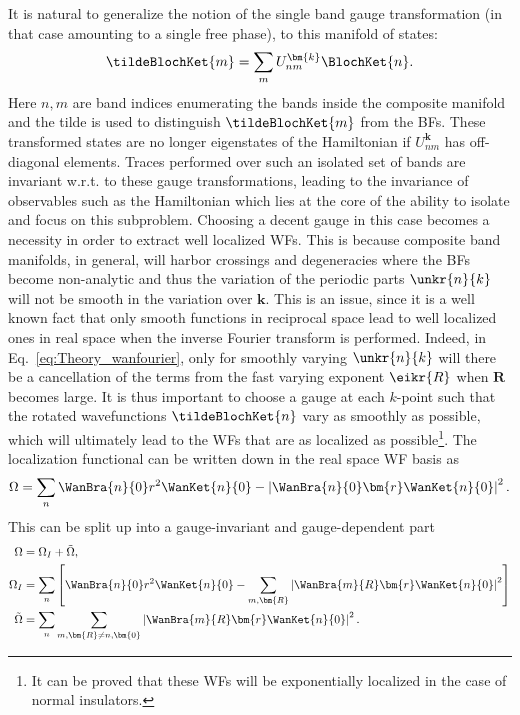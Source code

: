 It is natural to generalize the notion of the single band gauge transformation (in that case amounting to a single free phase), to this manifold of states:
\begin{equation}
	\tildeBlochKet{m} = \sum_m U_{nm}^{\bm{k}} \BlochKet{n}.
\end{equation}
Here $n,m$ are band indices enumerating the bands inside the composite manifold and the tilde is used to distinguish $\tildeBlochKet{m}$ from the BFs.
These transformed states are no longer eigenstates of the Hamiltonian if $U_{nm}^{\bm{k}}$ has off-diagonal elements.
Traces performed over such an isolated set of bands are invariant w.r.t. to these gauge transformations, leading to the invariance of observables such as the Hamiltonian which lies at the core of the ability to isolate and focus on this subproblem.
Choosing a decent gauge in this case becomes a necessity in order to extract well localized WFs.
This is because composite band manifolds, in general, will harbor crossings and degeneracies where the BFs become non-analytic and thus the variation of the periodic parts $\unkr{n}{k}$ will not be smooth in the variation over $\bm{k}$.
This is an issue, since it is a well known fact that only smooth functions in reciprocal space lead to well localized ones in real space when the inverse Fourier transform is performed.
Indeed, in Eq.~\ref{eq:Theory_wanfourier}, only for smoothly varying $\unkr{n}{k}$ will there be a cancellation of the terms from the fast varying exponent $\eikr{R}$ when $\bm{R}$ becomes large.
It is thus important to choose a gauge at each $k$-point such that the rotated wavefunctions $\tildeBlochKet{n}$ vary as smoothly as possible, which will ultimately lead to the WFs that are as localized as possible\footnote{It can be proved that these WFs will be exponentially localized in the case of normal insulators.}. 
The localization functional can be written down in the real space WF basis as
\begin{equation}
	\Omega =\sum_n \WanBra{n}{0}r^2\WanKet{n}{0} - \left|\WanBra{n}{0}\bm{r}\WanKet{n}{0}\right|^2.
\end{equation}
This can be split up into a gauge-invariant and gauge-dependent part
\begin{align}
	\Omega &= \Omega_I + \tilde\Omega,  \\
	\Omega_I &= \sum_n \left[\WanBra{n}{0} r^2 \WanKet{n}{0} - \sum_{m,\bm{R}} \left| \WanBra{m}{R} \bm{r} \WanKet{n}{0}\right|^2\right] \label{eq:Theory_omegaI}\\
	\tilde\Omega &= \sum_n \sum_{m,\bm{R} \neq n,\bm{0}} \left|\WanBra{m}{R} \bm{r} \WanKet{n}{0}\right|^2.
\end{align}
